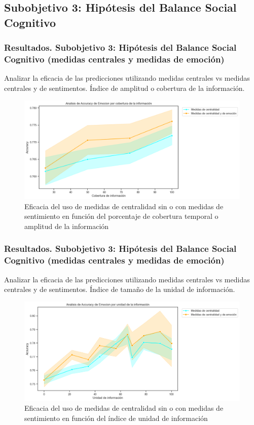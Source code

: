 \documentclass{beamer}
\begin{document}
\subsection{Subobjetivo 3: Hipótesis del Balance Social Cognitivo}
\begin{frame}
	\frametitle{Resultados. Subobjetivo 3: Hipótesis del Balance Social Cognitivo (medidas centrales y medidas de emoción)}
	\begin{block}{Analizar la eficacia de las predicciones utilizando
			medidas centrales vs medidas centrales y de sentimentos.}
		Índice de amplitud o cobertura de la información.
	\end{block}
\begin{figure}[H]
	\centering
	\includegraphics[width=0.6\linewidth]{figs/cap7/figura_53}
	\caption{Eficacia del uso de medidas de centralidad sin o con medidas de sentimiento en función del porcentaje de cobertura temporal o amplitud de la información}
	
	\label{fig:figura229}
\end{figure}

	
	
\end{frame}


\begin{frame}
	\frametitle{Resultados. Subobjetivo 3: Hipótesis del Balance Social Cognitivo (medidas centrales y medidas de emoción)}
\begin{block}{Analizar la eficacia de las predicciones utilizando
		medidas centrales vs medidas centrales y de sentimentos.}
		Índice de tamaño de la unidad de información.
	\end{block}
	
\begin{figure}[H]
	\centering
	\includegraphics[width=0.6\linewidth]{figs/cap7/figura_54}
	\caption{Eficacia del uso de medidas de centralidad sin o con medidas de sentimiento en función del índice de unidad de información}
	
	\label{fig:figura230}
\end{figure}
	
	
	
\end{frame}
\end{document}
